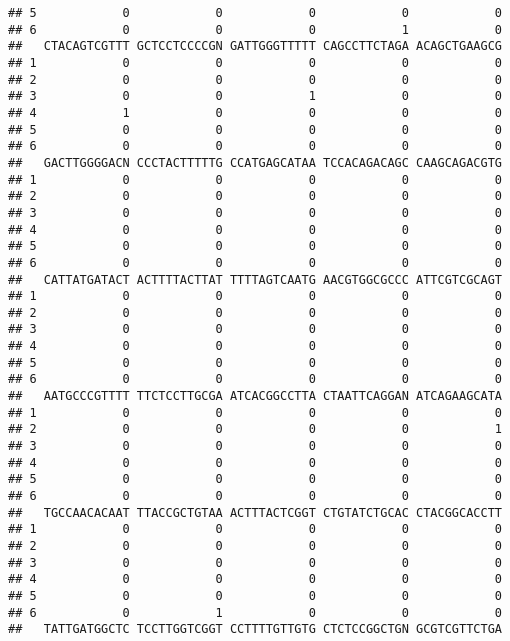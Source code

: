 \documentclass[]{article}
\begin{document}
\begin{verbatim}
## 5            0            0            0            0            0
## 6            0            0            0            1            0
##   CTACAGTCGTTT GCTCCTCCCCGN GATTGGGTTTTT CAGCCTTCTAGA ACAGCTGAAGCG
## 1            0            0            0            0            0
## 2            0            0            0            0            0
## 3            0            0            1            0            0
## 4            1            0            0            0            0
## 5            0            0            0            0            0
## 6            0            0            0            0            0
##   GACTTGGGGACN CCCTACTTTTTG CCATGAGCATAA TCCACAGACAGC CAAGCAGACGTG
## 1            0            0            0            0            0
## 2            0            0            0            0            0
## 3            0            0            0            0            0
## 4            0            0            0            0            0
## 5            0            0            0            0            0
## 6            0            0            0            0            0
##   CATTATGATACT ACTTTTACTTAT TTTTAGTCAATG AACGTGGCGCCC ATTCGTCGCAGT
## 1            0            0            0            0            0
## 2            0            0            0            0            0
## 3            0            0            0            0            0
## 4            0            0            0            0            0
## 5            0            0            0            0            0
## 6            0            0            0            0            0
##   AATGCCCGTTTT TTCTCCTTGCGA ATCACGGCCTTA CTAATTCAGGAN ATCAGAAGCATA
## 1            0            0            0            0            0
## 2            0            0            0            0            1
## 3            0            0            0            0            0
## 4            0            0            0            0            0
## 5            0            0            0            0            0
## 6            0            0            0            0            0
##   TGCCAACACAAT TTACCGCTGTAA ACTTTACTCGGT CTGTATCTGCAC CTACGGCACCTT
## 1            0            0            0            0            0
## 2            0            0            0            0            0
## 3            0            0            0            0            0
## 4            0            0            0            0            0
## 5            0            0            0            0            0
## 6            0            1            0            0            0
##   TATTGATGGCTC TCCTTGGTCGGT CCTTTTGTTGTG CTCTCCGGCTGN GCGTCGTTCTGA

\end{verbatim}
\end{document}
